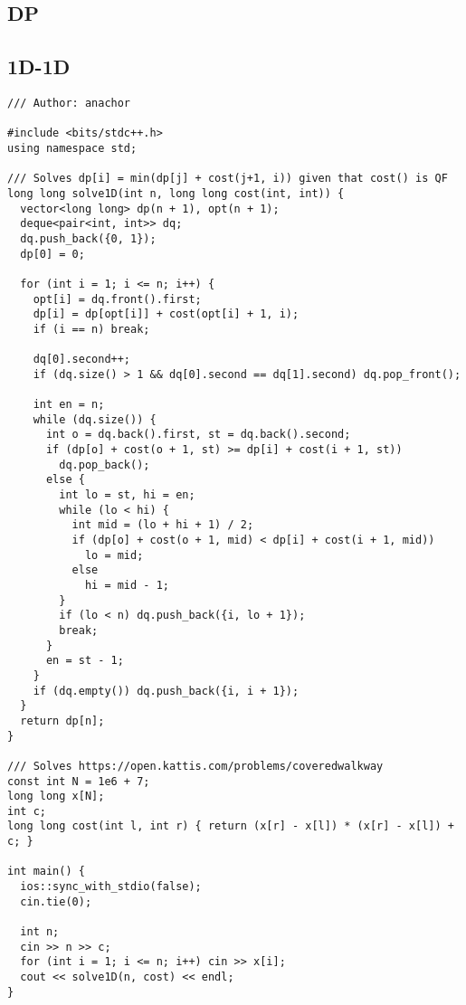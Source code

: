 \documentclass[FSZ,a4paper,onesided]{article}
\begin{document}
\begin{multicols*}{\COLS}
\section{DP}
\subsection{1D-1D}
\begin{lstlisting}
/// Author: anachor

#include <bits/stdc++.h>
using namespace std;

/// Solves dp[i] = min(dp[j] + cost(j+1, i)) given that cost() is QF
long long solve1D(int n, long long cost(int, int)) {
  vector<long long> dp(n + 1), opt(n + 1);
  deque<pair<int, int>> dq;
  dq.push_back({0, 1});
  dp[0] = 0;

  for (int i = 1; i <= n; i++) {
    opt[i] = dq.front().first;
    dp[i] = dp[opt[i]] + cost(opt[i] + 1, i);
    if (i == n) break;

    dq[0].second++;
    if (dq.size() > 1 && dq[0].second == dq[1].second) dq.pop_front();

    int en = n;
    while (dq.size()) {
      int o = dq.back().first, st = dq.back().second;
      if (dp[o] + cost(o + 1, st) >= dp[i] + cost(i + 1, st))
        dq.pop_back();
      else {
        int lo = st, hi = en;
        while (lo < hi) {
          int mid = (lo + hi + 1) / 2;
          if (dp[o] + cost(o + 1, mid) < dp[i] + cost(i + 1, mid))
            lo = mid;
          else
            hi = mid - 1;
        }
        if (lo < n) dq.push_back({i, lo + 1});
        break;
      }
      en = st - 1;
    }
    if (dq.empty()) dq.push_back({i, i + 1});
  }
  return dp[n];
}

/// Solves https://open.kattis.com/problems/coveredwalkway
const int N = 1e6 + 7;
long long x[N];
int c;
long long cost(int l, int r) { return (x[r] - x[l]) * (x[r] - x[l]) + c; }

int main() {
  ios::sync_with_stdio(false);
  cin.tie(0);

  int n;
  cin >> n >> c;
  for (int i = 1; i <= n; i++) cin >> x[i];
  cout << solve1D(n, cost) << endl;
}
\end{lstlisting}

\end{multicols*}
\end{document}
